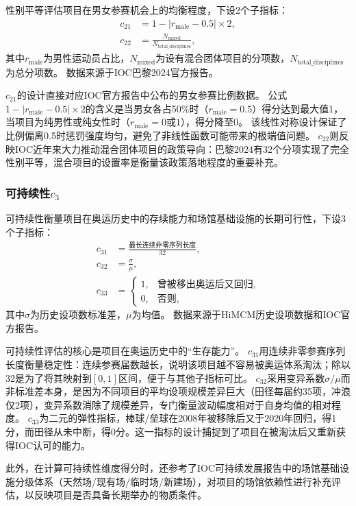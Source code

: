 \documentclass[twoside]{CUGThesis}
\begin{document}
性别平等评估项目在男女参赛机会上的均衡程度，下设2个子指标：
\begin{align}
c_{21} &= 1 - |r_{\text{male}} - 0.5| \times 2, \\
c_{22} &= \frac{N_{\text{mixed}}}{N_{\text{total\_disciplines}}},
\end{align}
其中$r_{\text{male}}$为男性运动员占比，$N_{\text{mixed}}$为设有混合团体项目的分项数，$N_{\text{total\_disciplines}}$为总分项数。
数据来源于IOC巴黎2024官方报告\cite{IOC2024}。

$c_{21}$的设计直接对应IOC官方报告中公布的男女参赛比例数据。
公式$1 - |r_{\text{male}} - 0.5| \times 2$的含义是当男女各占50\%时（$r_{\text{male}}=0.5$）得分达到最大值1，当项目为纯男性或纯女性时（$r_{\text{male}}=0$或$1$），得分降至0。
该线性对称设计保证了比例偏离0.5时惩罚强度均匀，避免了非线性函数可能带来的极端值问题。
$c_{22}$则反映IOC近年来大力推动混合团体项目的政策导向：巴黎2024有32个分项实现了完全性别平等，混合项目的设置率是衡量该政策落地程度的重要补充。

\subsubsection{可持续性$c_3$}

可持续性衡量项目在奥运历史中的存续能力和场馆基础设施的长期可行性，下设3个子指标：
\begin{align}
c_{31} &= \frac{\text{最长连续非零序列长度}}{32}, \\
c_{32} &= \frac{\sigma}{\mu}, \\
c_{33} &=
\begin{cases}
1, & \text{曾被移出奥运后又回归}, \\
0, & \text{否则},
\end{cases}
\end{align}
其中$\sigma$为历史设项数标准差，$\mu$为均值。
数据来源于HiMCM历史设项数据和IOC官方报告。

可持续性评估的核心是项目在奥运历史中的``生存能力''。
$c_{31}$用连续非零参赛序列长度衡量稳定性：连续参赛届数越长，说明该项目越不容易被奥运体系淘汰；除以32是为了将其映射到$[0,1]$区间，便于与其他子指标可比。
$c_{32}$采用变异系数$\sigma/\mu$而非标准差本身，是因为不同项目的平均设项规模差异巨大（田径每届约35项，冲浪仅2项），变异系数消除了规模差异，专门衡量波动幅度相对于自身均值的相对程度。
$c_{33}$为二元的弹性指标，棒球/垒球在2008年被移除后又于2020年回归，得1分，而田径从未中断，得0分。这一指标的设计捕捉到了项目在被淘汰后又重新获得IOC认可的能力。

此外，在计算可持续性维度得分时，还参考了IOC可持续发展报告\cite{IOC2024}中的场馆基础设施分级体系（天然场/现有场/临时场/新建场），对项目的场馆依赖性进行补充评估，以反映项目是否具备长期举办的物质条件。
\end{document}
